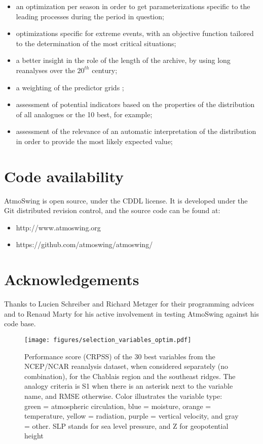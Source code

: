 \documentclass[review]{elsarticle}
\begin{document}
\begin{itemize}
	\item an optimization per season in order to get parameterizations specific to the leading processes during the period in question;
	\item optimizations specific for extreme events, with an objective function tailored to the determination of the most critical situations;
	\item a better insight in the role of the length of the archive, by using long reanalyses over the $20^{th}$ century;	
	\item a weighting of the predictor grids \citep[see][]{Bliefernicht2010};
	\item assessment of potential indicators based on the properties of the distribution of all analogues or the 10 best, for example;
	\item assessment of the relevance of an automatic interpretation of the distribution in order to provide the most likely expected value;
\end{itemize}


\section*{Code availability}

AtmoSwing is open source, under the CDDL license. It is developed under the Git distributed revision control, and the source code can be found at:

\begin{itemize}
	\item http://www.atmoswing.org
	\item https://github.com/atmoswing/atmoswing/
\end{itemize}


\section*{Acknowledgements}
Thanks to Lucien Schreiber and Richard Metzger for their programming advices and to Renaud Marty for his active involvement in testing AtmoSwing against his code base.





\clearpage


\begin{figure*}[t]
	\texttt{[image: figures/selection\_variables\_optim.pdf]}
	\caption{Performance score (CRPSS) of the 30 best variables from the NCEP/NCAR reanalysis dataset, when considered separately (no combination), for the Chablais region and the southeast ridges. The analogy criteria is S1 when there is an asterisk next to the variable name, and RMSE otherwise. Color illustrates the variable type: green = atmospheric circulation, blue = moisture, orange = temperature, yellow = radiation, purple = vertical velocity, and gray = other. SLP stands for sea level pressure, and Z for geopotential height}
	\label{figure:variable_exploration}
\end{figure*}
\end{document}
